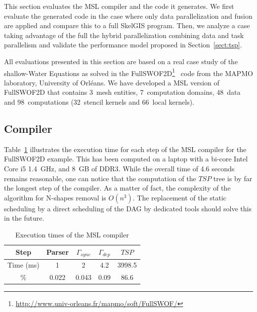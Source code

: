 This section evaluates the MSL compiler and the code it generates.
We first evaluate the generated code in the case where only data parallelization and fusion are applied and compare this to a full SkelGIS program.
Then, we analyze a case taking advantage of the full the hybrid parallelization combining data and task parallelism and validate the performance model proposed in Section~\ref{sect:tsp}.

All evaluations presented in this section are based on a real case study of the shallow-Water Equations as solved in  the FullSWOF2D\footnote{\url{http://www.univ-orleans.fr/mapmo/soft/FullSWOF/}}~\cite{Ferrari2004,CPE:CPE3494} code from the MAPMO laboratory, University of Orl\'eans.
We have developed a MSL version of FullSWOF2D that contains 3~mesh entities, 7~computation domains, 48~data and 98~computations (32~stencil kernels and 66~local kernels).

\subsection{Compiler}

Table~\ref{fig:exectime} illustrates the execution time for each step of the MSL compiler for the FullSWOF2D example.
This has been computed on a laptop with a bi-core Intel Core i5 1.4~GHz, and 8~GB of DDR3.
While the overall time of 4.6 seconds remains reasonable, one can notice that the computation of the $TSP$ tree is by far the longest step of the compiler.
As a matter of fact, the complexity of the algorithm for N-shapes removal is $O(n^3)$.
The replacement of the static scheduling by a direct scheduling of the DAG by dedicated tools should solve this in the future.

\begin{table}[!h]
 \begin{center}
 \begin{tabular}{|c|c|c|c|c|}
  \hline
   Step & Parser & $\Gamma_{sync}$ & $\Gamma_{dep}$ & $TSP$\\
   \hline
   Time (ms) & 1 & 2 & 4.2 & 3998.5\\
   \hline
   \% & 0.022 & 0.043 & 0.09 & 86.6\\
   \hline
 \end{tabular}
\caption{Execution times of the MSL compiler}
\label{fig:exectime}
 \end{center}
\end{table}

